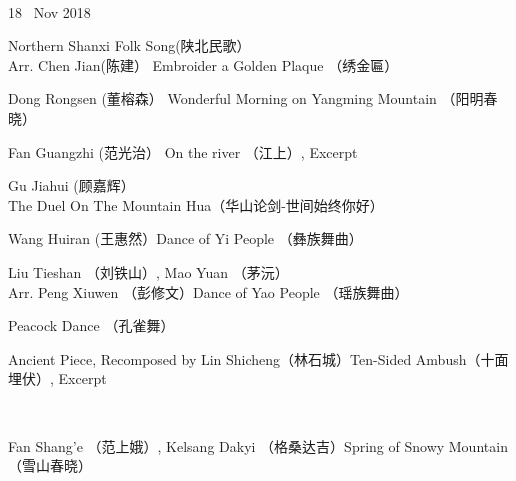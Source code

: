 \documentclass[letter,6pt,poets]{ConcProg}
\begin{document}
\begin{spacing}{1.0}
\begin{programme}{
\\  {\normalsize 18 ~Nov 2018}
}
\begin{part}[]
    \begin{composition}{Northern Shanxi Folk Song(陕北民歌）\\Arr. Chen Jian(陈建）} {}{Embroider a Golden Plaque  （绣金匾）}{}
    \end{composition}
    \begin{composition}{Dong Rongsen (董榕森）} {}{Wonderful Morning on Yangming Mountain  （阳明春晓）
}{}
    \end{composition}
    \begin{composition}{Fan Guangzhi (范光治）} {}{On the river （江上）, Excerpt}{}
                   {}{}
    \end{composition}
     \begin{composition}{Gu Jiahui (顾嘉辉）} {}{The Duel On The Mountain Hua（华山论剑-世间始终你好）}{}
                   {}{}
    \end{composition}    
    \begin{composition}{Wang Huiran (王惠然）}{}{Dance of Yi People  （彝族舞曲）}{}
                   {}{}
    \end{composition}
    \begin{composition}{Liu Tieshan （刘铁山）, Mao Yuan （茅沅） \\Arr. Peng Xiuwen （彭修文）}{}{Dance of Yao People  （瑶族舞曲）}{}
    \end{composition}
    \begin{composition}{}{}{Peacock Dance （孔雀舞） }{}
                   {}{}
    \end{composition}
    \begin{composition}{Ancient Piece, Recomposed by Lin Shicheng（林石城）}{}{Ten-Sided Ambush（十面埋伏）, Excerpt}{}
    \end{composition}\\
    \begin{composition}{Fan Shang'e （范上娥）, Kelsang Dakyi （格桑达吉）}{}{Spring of Snowy Mountain   （雪山春晓）}{}
                   {}{}
    \end{composition}

\end{part}
\end{programme}
\end{spacing}
\end{document}
